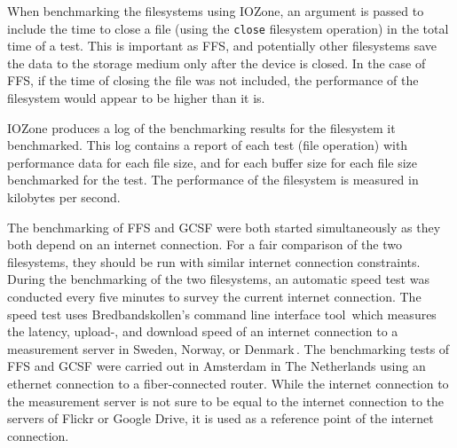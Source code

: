 When benchmarking the filesystems using IOZone, an argument is passed to include the time to close a file (using the \texttt{close} filesystem operation) in the total time of a test. This is important as \gls{FFS}, and potentially other filesystems save the data to the storage medium only after the device is closed. In the case of \gls{FFS}, if the time of closing the file was not included, the performance of the filesystem would appear to be higher than it is.

IOZone produces a log of the benchmarking results for the filesystem it benchmarked. This log contains a report of each test (file operation) with performance data for each file size, and for each buffer size for each file size benchmarked for the test. The performance of the filesystem is measured in kilobytes per second.

The benchmarking of \gls{FFS} and \gls{GCSF} were both started simultaneously as they both depend on an internet connection. For a fair comparison of the two filesystems, they should be run with similar internet connection constraints. During the benchmarking of the two filesystems, an automatic speed test was conducted every five minutes to survey the current internet connection. The speed test uses Bredbandskollen's command line interface tool\,\cite{internetstiftelsenBredbandskollenCLIBredbandskollen} which measures the latency, upload-, and download speed of an internet connection to a measurement server in Sweden, Norway, or Denmark\,\cite{internetstiftelsenMerOmBredbandskollen}. The benchmarking tests of \gls{FFS} and \gls{GCSF} were carried out in Amsterdam in The Netherlands using an ethernet connection to a fiber-connected router. While the internet connection to the measurement server is not sure to be equal to the internet connection to the servers of Flickr or Google Drive, it is used as a reference point of the internet connection.